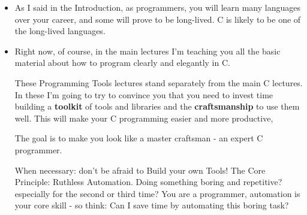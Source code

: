 \documentclass[aspectratio=169]{beamer}
\begin{document}
\begin{frame}
\large
      \begin{itemize}
      \item
      As I said in the Introduction, as programmers, you will learn
      \alert{many languages} over your career, and some will prove to
      be long-lived.  C is likely to be one of the long-lived languages.

      \item
      Right now, of course, in the main lectures I'm teaching you all the
      basic material about how to program clearly and elegantly in C.
      \pause

      \pitem
      These Programming Tools lectures stand separately from the main
      C lectures. In these I'm going to try to convince you that you need
      to invest time building a {\bf toolkit} of tools and libraries and the
      {\bf craftsmanship} to use them well.
      This will make your C programming easier and more productive,

    \pitem
      The goal is to make you look like a \alert{master craftsman} - an expert C programmer.

    \pitem
      When necessary: don't be afraid to \alert{Build your own Tools!}
    \pitem
      The Core Principle: \alert{Ruthless Automation}.
    \pitem
      Doing something boring and repetitive?
    \pause
      especially for the second or third time?
    \pitem
      You are a \alert{programmer}, automation is your core skill -
      so think:
      \alert{Can I save time by automating this boring task?}
    \end{itemize}
\end{frame}
\end{document}
